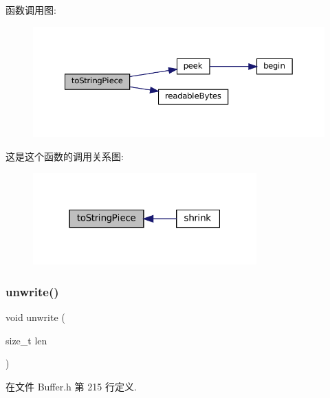 函数调用图\+:
\nopagebreak
\begin{figure}[H]
\begin{center}
\leavevmode
\includegraphics[width=350pt]{classmuduo_1_1net_1_1Buffer_a78096dee3d0826efb63a5b814eef37c4_cgraph}
\end{center}
\end{figure}
这是这个函数的调用关系图\+:
\nopagebreak
\begin{figure}[H]
\begin{center}
\leavevmode
\includegraphics[width=244pt]{classmuduo_1_1net_1_1Buffer_a78096dee3d0826efb63a5b814eef37c4_icgraph}
\end{center}
\end{figure}
\mbox{\label{classmuduo_1_1net_1_1Buffer_a851a742d16106f81629a5315d80e0616}} 
\subsubsection{\texorpdfstring{unwrite()}{unwrite()}}
{\footnotesize\ttfamily void unwrite (\begin{DoxyParamCaption}\item[{size\+\_\+t}]{len }\end{DoxyParamCaption})\hspace{0.3cm}{\ttfamily [inline]}}



在文件 Buffer.\+h 第 215 行定义.



